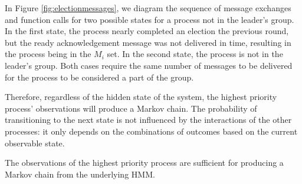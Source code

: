 
In Figure \ref{fig:electionmessages}, we diagram the sequence of message exchanges and function calls for two possible states for a process not in the leader's group.
In the first state, the process nearly completed an election the previous round, but the ready acknowledgement message was not delivered in time, resulting in the process being in the $M_i$ set.
In the second state, the process is not in the leader's group.
Both cases require the same number of messages to be delivered for the process to be considered a part of the group.

Therefore, regardless of the hidden state of the system, the highest priority process' observations will produce a Markov chain.
The probability of transitioning to the next state is not influenced by the interactions of the other processes: it only depends on the combinations of outcomes based on the current observable state.

\begin{thm}
    The observations of the highest priority process are sufficient for producing a Markov chain from the underlying \ac{HMM}.
\end{thm}

